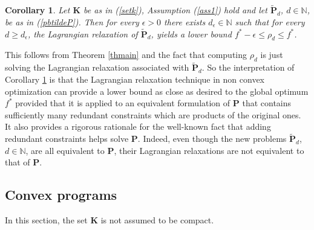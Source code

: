 \documentclass[11pt]{article}
\newtheorem{cor}{Corollary}[section]
\numberwithin{equation}{section}
\def\N{\mathbb{N}}
\def\K{\mathbf{K}}
\def\P{\mathbf{P}}
\begin{document}
\begin{cor}
\label{lagrangian}
Let $\K$ be as in (\ref{setk}), Assumption (\ref{ass1}) hold and let $\tilde{\P}_d$, $d\in\N$,  be as in (\ref{pbtildeP}).
Then for every $\epsilon>0$ there exists $d_\epsilon\in\N$ such that for every $d\geq d_\epsilon$,
the Lagrangian relaxation of $\tilde{\P}_d$, 
yields a lower bound $f^*-\epsilon\leq \rho_d\leq f^*$. 
\end{cor}
This follows from Theorem \ref{thmain} and the fact that computing $\rho_d$ is just solving the Lagrangian relaxation associated with
$\tilde{\P}_d$. So the interpretation of Corollary \ref{lagrangian} is that the Lagrangian relaxation
technique in non convex optimization can provide a lower bound as close as desired to the global optimum $f^*$ provided that
it is applied to an equivalent formulation of $\P$ that contains sufficiently many 
redundant constraints which are products of the original ones. It also provides a rigorous rationale for the well-known fact that
adding redundant constraints helps solve $\P$. Indeed, even though the new problems $\tilde{\P}_d$, $d\in\N$,
are all equivalent to $\P$, their Lagrangian relaxations are not equivalent to that of $\P$.


\subsection{Convex programs}

In this section, the set $\K$ is not assumed to be compact.
\end{document}
